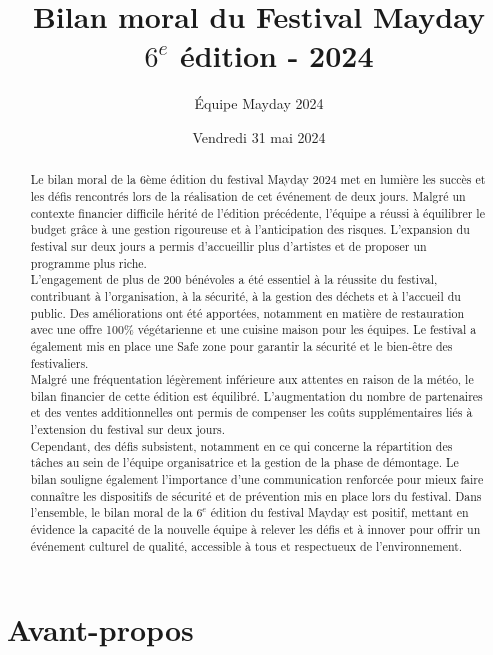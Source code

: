 \documentclass[12pt,a4paper]{report}
\title{Bilan moral du Festival Mayday \\ $6^e$ édition - 2024}
\author{Équipe Mayday 2024}
\date{Vendredi 31 mai 2024}
\begin{document}
\maketitle

\begin{abstract}
Le bilan moral de la 6ème édition du festival Mayday 2024 met en lumière les succès et les défis rencontrés lors de la réalisation de cet événement de deux jours. Malgré un contexte financier difficile hérité de l’édition précédente, l’équipe a réussi à équilibrer le budget grâce à une gestion rigoureuse et à l’anticipation des risques. L’expansion du festival sur deux jours a permis d’accueillir plus d’artistes et de proposer un programme plus riche.\\

L’engagement de plus de 200 bénévoles a été essentiel à la réussite du festival, contribuant à l’organisation, à la sécurité, à la gestion des déchets et à l’accueil du public. Des améliorations ont été apportées, notamment en matière de restauration avec une offre 100\% végétarienne et une cuisine maison pour les équipes. Le festival a également mis en place une \og Safe zone \fg{} pour garantir la sécurité et le bien-être des festivaliers.\\

Malgré une fréquentation légèrement inférieure aux attentes en raison de la météo, le bilan financier de cette édition est équilibré. L’augmentation du nombre de partenaires et des ventes additionnelles ont permis de compenser les coûts supplémentaires liés à l’extension du festival sur deux jours.\\

Cependant, des défis subsistent, notamment en ce qui concerne la répartition des tâches au sein de l’équipe organisatrice et la gestion de la phase de démontage. Le bilan souligne également l’importance d’une communication renforcée pour mieux faire connaître les dispositifs de sécurité et de prévention mis en place lors du festival. Dans l’ensemble, le bilan moral de la $6^e$ édition du festival Mayday est positif, mettant en évidence la capacité de la nouvelle équipe à relever les défis et à innover pour offrir un événement culturel de qualité, accessible à tous et respectueux de l’environnement.
\end{abstract}

\tableofcontents

\newpage

\section*{Avant-propos}
\end{document}
